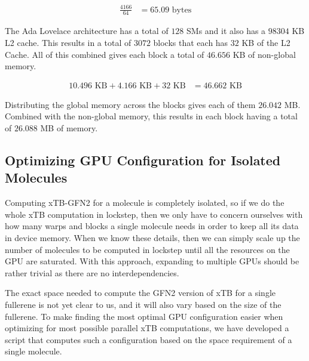 \begin{equation}
\begin{split}
  \frac{4166}{64} &= 65.09 \text{ bytes}
\end{split}
\end{equation}

The Ada Lovelace architecture has a total of $128$ SMs and it also has a $98304$ KB L2 cache. This results in a total of $3072$ blocks that each has $32$ KB of the L2 Cache. All of this combined gives each block a total of $46.656$ KB of non-global memory.

\begin{equation}
\begin{split}
  10.496 \text{ KB} + 4.166 \text{ KB} + 32 \text{ KB} &= 46.662 \text{ KB}
\end{split}
\end{equation}

Distributing the global memory across the blocks gives each of them $26.042$ MB. Combined with the non-global memory, this results in each block having a total of $26.088$ MB of memory.

\subsection{Optimizing GPU Configuration for Isolated Molecules}

Computing xTB-GFN2 for a molecule is completely isolated, so if we do the whole xTB computation in lockstep, then we only have to concern ourselves with how many warps and blocks a single molecule needs in order to keep all its data in device memory. When we know these details, then we can simply scale up the number of molecules to be computed in lockstep until all the resources on the GPU are saturated. With this approach, expanding to multiple GPUs should be rather trivial as there are no interdependencies.

The exact space needed to compute the GFN2 version of xTB for a single fullerene is not yet clear to us, and it will also vary based on the size of the fullerene. To make finding the most optimal GPU configuration easier when optimizing for most possible parallel xTB computations, we have developed a script that computes such a configuration based on the space requirement of a single molecule.

